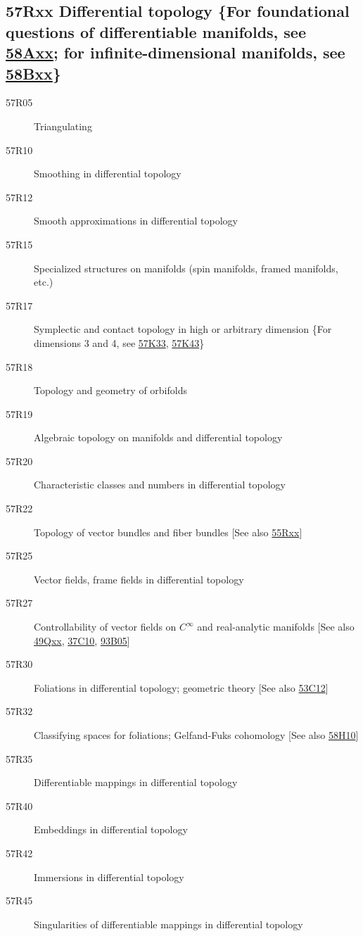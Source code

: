 \subsection*{57Rxx  Differential topology \{For foundational questions of differentiable manifolds, see \hyperref[58Axx]{58Axx}; for infinite-dimensional manifolds, see \hyperref[58Bxx]{58Bxx}\} }\label{57Rxx}
\begin{description}  
\item [57R05]\label{57R05} Triangulating 
\item [57R10]\label{57R10} Smoothing in differential topology
\item [57R12]\label{57R12} Smooth approximations in differential topology
\item [57R15]\label{57R15} Specialized structures on manifolds (spin manifolds, framed manifolds, etc.)
\item [57R17]\label{57R17} Symplectic and contact topology in high or arbitrary dimension \{For dimensions 3 and 4, see \hyperref[57K33]{57K33}, \hyperref[57K43]{57K43}\}
\item [57R18]\label{57R18} Topology and geometry of orbifolds
\item [57R19]\label{57R19} Algebraic topology on manifolds and differential topology
\item [57R20]\label{57R20} Characteristic classes and numbers in differential topology
\item [57R22]\label{57R22} Topology of vector bundles and fiber bundles [See also \hyperref[55Rxx]{55Rxx}]
\item [57R25]\label{57R25} Vector fields, frame fields in differential topology
\item [57R27]\label{57R27} Controllability of vector fields on $C^\infty$ and real-analytic manifolds [See also \hyperref[49Qxx]{49Qxx}, \hyperref[37C10]{37C10}, \hyperref[93B05]{93B05}]
\item [57R30]\label{57R30} Foliations in differential topology; geometric theory [See also \hyperref[53C12]{53C12}]
\item [57R32]\label{57R32} Classifying spaces for foliations; Gelfand-Fuks cohomology [See also \hyperref[58H10]{58H10}]
\item [57R35]\label{57R35} Differentiable mappings in differential topology
\item [57R40]\label{57R40} Embeddings in differential topology
\item [57R42]\label{57R42} Immersions in differential topology
\item [57R45]\label{57R45} Singularities of differentiable mappings in differential topology

\end{description}
